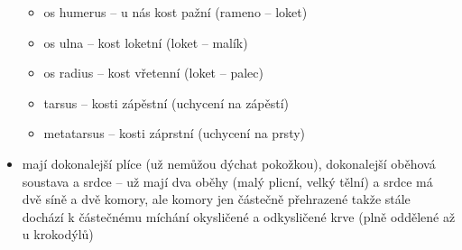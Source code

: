 \documentclass{article}
\begin{document}
\begin{itemize}
\begin{itemize}
    \item os humerus -- u nás kost pažní (rameno -- loket)
    \item os ulna -- kost loketní (loket -- malík)
    \item os radius -- kost vřetenní (loket -- palec)
    \item tarsus -- kosti zápěstní (uchycení na zápěstí)
    \item metatarsus -- kosti záprstní (uchycení na prsty)
  \end{itemize}
  \item mají dokonalejší plíce (už nemůžou dýchat pokožkou), dokonalejší oběhová soustava a srdce -- už mají dva oběhy (malý plicní, velký tělní) a srdce má dvě síně a dvě komory, ale komory jen částečně přehrazené takže stále dochází k částečnému míchání okysličené a odkysličené krve (plně oddělené až u krokodýlů)
\end{itemize}
\end{document}
